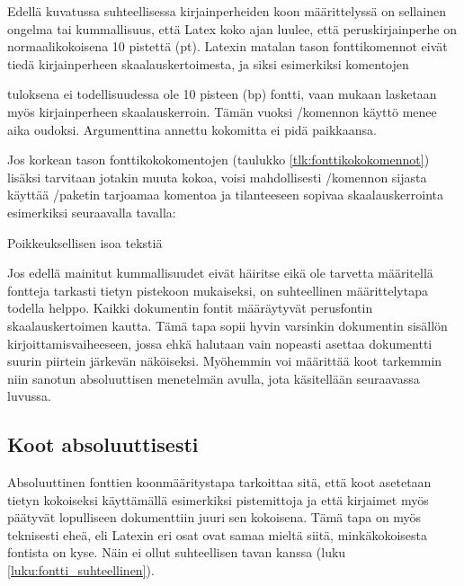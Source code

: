 Edellä kuvatussa suhteellisessa kirjainperheiden koon määrittelyssä on
sellainen ongelma tai kummallisuus, että Latex koko ajan luulee, että
peruskirjainperhe on normaalikokoisena 10 pistettä (pt). Latexin matalan
tason fonttikomennot eivät tiedä kirjainperheen skaalauskertoimesta, ja
siksi esimerkiksi komentojen

\begin{koodilohkosis}
  \fontsize{10bp}{12bp} \selectfont
\end{koodilohkosis}

tuloksena ei todellisuudessa ole 10 pisteen (bp) fontti, vaan mukaan
lasketaan myös kirjainperheen skaalauskerroin. Tämän vuoksi \-/komennon käyttö menee aika oudoksi. Argumenttina annettu
kokomitta ei pidä paikkaansa.

Jos korkean tason font\-ti\-koko\-komen\-to\-jen (taulukko
\ref{tlk:fonttikokokomennot}) lisäksi tarvitaan jotakin muuta kokoa,
voisi mahdollisesti \-/komennon sijasta käyttää
\-/paketin tarjoamaa komentoa ja tilanteeseen sopivaa
skaalauskerrointa esimerkiksi seuraavalla tavalla:

\begin{koodilohkosis}
  { Poikkeuksellisen isoa tekstiä}
\end{koodilohkosis}

Jos edellä mainitut kummallisuudet eivät häiritse eikä ole tarvetta
määritellä fontteja tarkasti tietyn pistekoon mukaiseksi, on
suhteellinen määrittelytapa todella helppo. Kaikki dokumentin fontit
määräytyvät perusfontin skaalauskertoimen kautta. Tämä tapa sopii hyvin
varsinkin dokumentin sisällön kirjoittamisvaiheeseen, jossa ehkä
halutaan vain nopeasti asettaa dokumentti suurin piirtein järkevän
näköiseksi. Myöhemmin voi määrittää koot tarkemmin niin sanotun
absoluuttisen menetelmän avulla, jota käsitellään seuraavassa luvussa.

\subsection{Koot absoluuttisesti}
\label{luku:fontti_absoluuttinen}

Absoluuttinen fonttien koonmääritystapa tarkoittaa sitä, että koot
asetetaan tietyn kokoiseksi käyttämällä esimerkiksi pistemittoja ja että
kirjaimet myös päätyvät lopulliseen dokumenttiin juuri sen kokoisena.
Tämä tapa on myös teknisesti eheä, eli Latexin eri osat ovat samaa
mieltä siitä, minkäkokoisesta fontista on kyse. Näin ei ollut
suhteellisen tavan kanssa (luku \ref{luku:fontti_suhteellinen}).

